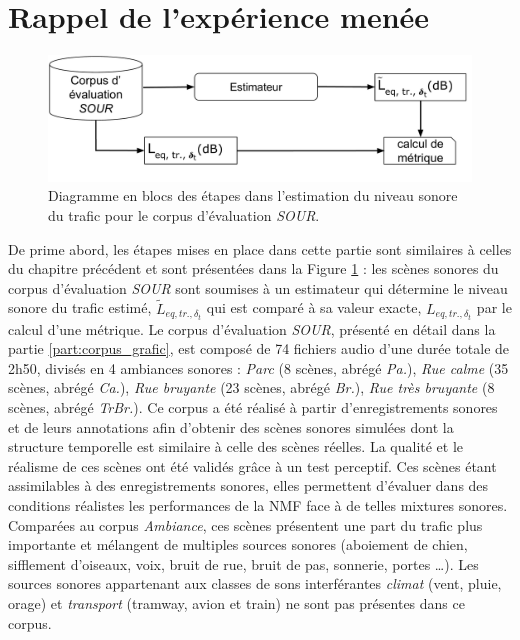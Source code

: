 \section{Rappel de l'expérience menée}\label{part:rappelExp}
 

\begin{figure}[ht]
\centering
\includegraphics[width=0.9\linewidth]{./figures/NMF/Bloc_diagram_estimateur_SOUR.pdf}
\caption{Diagramme en blocs des étapes dans l'estimation du niveau sonore du trafic pour le corpus d'évaluation \textit{SOUR}.}
\label{fig:diagram_SOUR}
\end{figure}


De prime abord, les étapes mises en place dans cette partie sont similaires à celles du chapitre précédent et sont présentées dans la Figure \ref{fig:diagram_SOUR} : les scènes sonores du corpus d'évaluation \textit{SOUR} sont soumises à un estimateur qui détermine le niveau sonore du trafic estimé, $\tilde{L}_{eq,tr.,\delta_t}$ qui est comparé à sa valeur exacte, $L_{eq,tr.,\delta_t}$ par le calcul d'une métrique.
Le corpus d'évaluation \textit{SOUR}, présenté en détail dans la partie \ref{part:corpus_grafic}, est composé de 74 fichiers audio d'une durée totale de 2h50, divisés en 4 ambiances sonores : \textit{Parc} (8 scènes, abrégé \textit{Pa.}), \textit{Rue calme} (35 scènes, abrégé \textit{Ca.}), \textit{Rue bruyante} (23 scènes, abrégé \textit{Br.}), \textit{Rue très bruyante} (8 scènes, abrégé \textit{TrBr.}). Ce corpus a été réalisé à partir d'enregistrements sonores et de leurs annotations afin d'obtenir des scènes sonores simulées dont la structure temporelle est similaire à celle des scènes réelles. La qualité et le réalisme de ces scènes ont été validés grâce à un test perceptif. Ces scènes étant assimilables à des enregistrements sonores, elles permettent d'évaluer dans des conditions réalistes les performances de la NMF face à de telles mixtures sonores. Comparées au corpus \textit{Ambiance}, ces scènes présentent une part du trafic plus importante et mélangent de multiples sources sonores (aboiement de chien, sifflement d'oiseaux, voix, bruit de rue, bruit de pas, sonnerie, portes \dots{}). Les sources sonores appartenant aux classes de sons interférantes \textit{climat} (vent, pluie, orage) et \textit{transport} (tramway, avion et train) ne sont pas présentes dans ce corpus.

